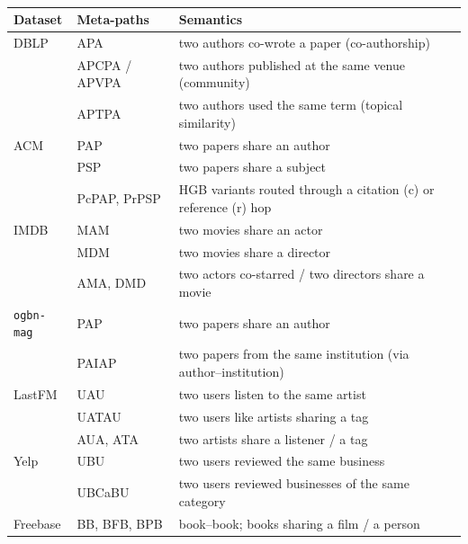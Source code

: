\begin{table}[htbp]
\centering
\small
\caption{}
\label{p2:tab:metapaths}
\begin{tabular}{llp{7.6cm}}
\toprule
Dataset & Meta-paths & Semantics \\
\midrule
DBLP & APA & two authors co-wrote a paper (co-authorship) \\
     & APCPA / APVPA & two authors published at the same venue (community) \\
     & APTPA & two authors used the same term (topical similarity) \\
\midrule
ACM  & PAP & two papers share an author \\
     & PSP & two papers share a subject \\
     & PcPAP, PrPSP & HGB variants routed through a citation (c) or reference (r) hop \\
\midrule
IMDB & MAM & two movies share an actor \\
     & MDM & two movies share a director \\
     & AMA, DMD & two actors co-starred / two directors share a movie \\
\midrule
\texttt{ogbn-mag} & PAP & two papers share an author \\
     & PAIAP & two papers from the same institution (via author--institution) \\
\midrule
LastFM & UAU & two users listen to the same artist \\
     & UATAU & two users like artists sharing a tag \\
     & AUA, ATA & two artists share a listener / a tag \\
\midrule
Yelp & UBU & two users reviewed the same business \\
     & UBCaBU & two users reviewed businesses of the same category \\
\midrule
Freebase & BB, BFB, BPB & book--book; books sharing a film / a person \\
\bottomrule
\end{tabular}
\end{table}

\clearpage
